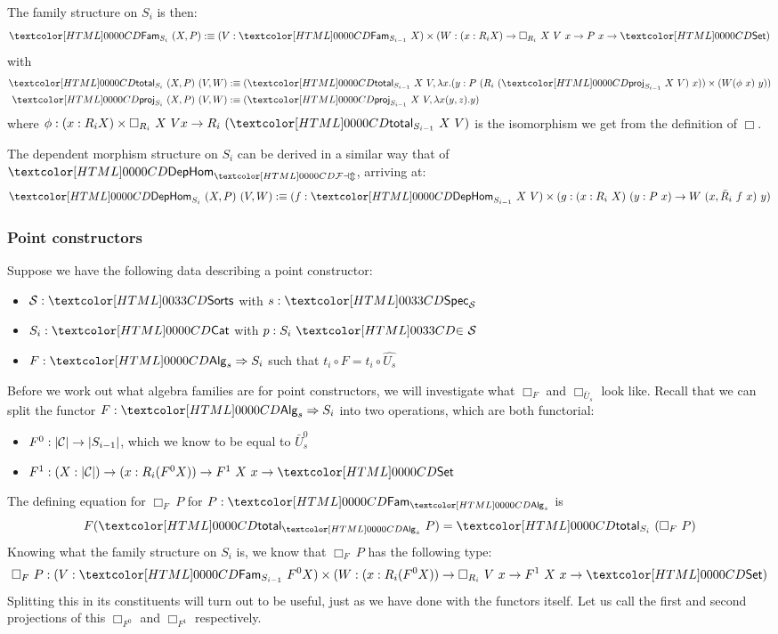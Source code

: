 The family structure on $S_i$ is then:
$$
  \Fam_{S_i}\ (X , P) \ddefeq (V : \Fam_{S_{i-1}} X) \times (W : (x : R_i X) \to \Box_{R_i}\ X\ V\ x \to P\ x \to \Set)
$$
with
%
\begin{align*}
  \total_{S_i}\ (X , P)\ (V , W) &\ddefeq (\total_{S_{i-1}}\ X\ V, \lambda x . (y : P\ (R_i\ (\proj_{S_{i-1}}\ X\ V)\ x)) \times (W (\phi\ x)\ y)) \\
  \proj_{S_i}\ (X, P)\ (V, W) &\ddefeq (\proj_{S_{i-1}}\ X\ V, \lambda x (y , z) . y)
\end{align*}
%
where
$\phi : (x : R_i X) \times \Box_{R_i}\ X\ V x \to R_i\
(\total_{S_{i-1}}\ X\ V)$
is the isomorphism we get from the definition of $\Box$.

The dependent morphism structure on $S_i$ can be derived in a similar
way that of $\DepHom_{\FAM}$, arriving at:
$$
  \DepHom_{S_i}\ (X , P)\ (V , W) \ddefeq (f : \DepHom_{S_{i-1}}\ X\ V) \times (g : (x : R_i\ X)\ (y : P\ x) \to W\ (x , \bar{R}_i\ f\ x)\ y)\\
$$

\subsubsection{Point constructors}

Suppose we have the following data describing a point constructor:
%
\begin{itemize}
\item $\Ss : \sortsty$ with $s : \specty_{\Ss}$
\item $S_i : \Cat$ with $p : \sortsin{S_i}{\Ss}$
\item $F : \Func{\Alg_s}{S_i}$ such that $t_i \circ F = t_i \circ \hat{U_s}$
\end{itemize}

Before we work out what algebra families are for point constructors,
we will investigate what $\Box_F$ and $\Box_{\bar{U}_s}$ look
like. Recall that we can split the functor $F : \Func{\Alg_s}{S_i}$
into two operations, which are both functorial:
\begin{itemize}
\item $F^0 : | \mathcal{C} | \to |S_{i-1}|$, which we know to be equal to $\bar{U}^0_s$
\item
  $F^1 : (X : | \Cc |) \to (x : R_i (F^0 X)) \to F^1\ X\ x \to \Set$
\end{itemize}

The defining equation for $\Box_F\ P$ for $P : \Fam_{\Alg_s}$ is
$$
F (\total_{\Alg_s}\ P) = \total_{S_i}\ (\Box_F\ P)
$$
Knowing what the family structure on $S_i$ is, we know that
$\Box_F\ P$ has the following type:
$$
\Box_F\ P : (V : \Fam_{S_{i-1}}\ F^0X) \times (W : (x : R_i (F^0 X)) \to \Box_{R_i}\ V\ x \to F^1\ X\ x \to \Set)
$$
Splitting this in its constituents will turn out to be useful, just as
we have done with the functors itself. Let us call the first and
second projections of this $\Box_{F^0}$ and $\Box_{F^1}$ respectively.

